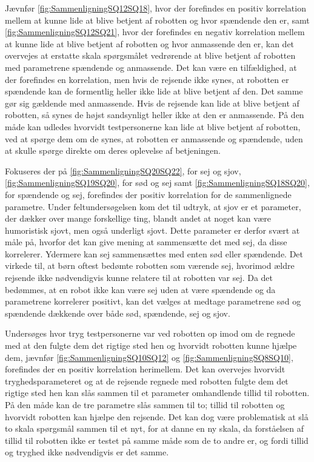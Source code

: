 Jævnfør \autoref{fig:SammenligningSQ12SQ18}, hvor der forefindes en positiv korrelation mellem at kunne lide at blive betjent af robotten og hvor spændende den er, samt \autoref{fig:SammenligningSQ12SQ21}, hvor der forefindes en negativ korrelation mellem at kunne lide at blive betjent af robotten og hvor anmassende den er, kan det overvejes at erstatte skala spørgsmålet vedrørende at blive betjent af robotten med parametrene spændende og anmassende. Det kan være en tilfældighed, at der forefindes en korrelation, men hvis de rejsende ikke synes, at robotten er spændende kan de formentlig heller ikke lide at blive betjent af den. Det samme gør sig gældende med anmassende. Hvis de rejsende kan lide at blive betjent af robotten, så synes de højst sandsynligt heller ikke at den er anmassende. På den måde kan udledes hvorvidt testpersonerne kan lide at blive betjent af robotten, ved at spørge dem om de synes, at robotten er anmassende og spændende, uden at skulle spørge direkte om deres oplevelse af betjeningen.

Fokuseres der på \autoref{fig:SammenligningSQ20SQ22}, for sej og sjov, \autoref{fig:SammenligningSQ19SQ20}, for sød og sej samt \autoref{fig:SammenligningSQ18SQ20}, for spændende og sej, forefindes der positiv korrelation for de sammenlignede parametre. Under feltundersøgelsen kom det til udtryk, at sjov er et parameter, der dækker over mange forskellige ting, blandt andet at noget kan være humoristisk sjovt, men også underligt sjovt. Dette parameter er derfor svært at måle på, hvorfor det kan give mening at sammensætte det med sej, da disse korrelerer. Ydermere kan sej sammensættes med enten sød eller spændende. Det virkede til, at børn oftest bedømte robotten som værende sej, hvorimod ældre rejsende ikke nødvendigvis kunne relatere til at robotten var sej. Da det bedømmes, at en robot ikke kan være sej uden at være spændende og da parametrene korrelerer positivt, kan det vælges at medtage parametrene sød og spændende dækkende over både sød, spændende, sej og sjov.  

Undersøges hvor tryg testpersonerne var ved robotten op imod om de regnede med at den fulgte dem det rigtige sted hen og hvorvidt robotten kunne hjælpe dem, jævnfør \autoref{fig:SammenligningSQ10SQ12} og \autoref{fig:SammenligningSQ8SQ10}, forefindes der en positiv korrelation herimellem. Det kan overvejes hvorvidt tryghedsparameteret og at de rejsende regnede med robotten fulgte dem det rigtige sted hen kan slås sammen til et parameter omhandlende tillid til robotten. På den måde kan de tre parametre slås sammen til to; tillid til robotten og hvorvidt robotten kan hjælpe den rejsende. Det kan dog være problematisk at slå to skala spørgsmål sammen til et nyt, for at danne en ny skala, da forståelsen af tillid til robotten ikke er testet på samme måde som de to andre er, og fordi tillid og tryghed ikke nødvendigvis er det samme. 


